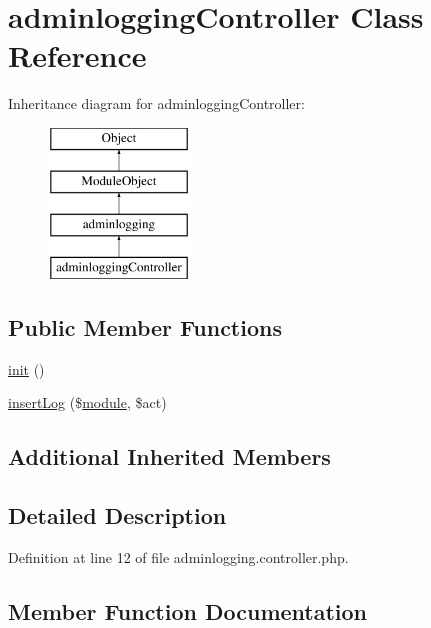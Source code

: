 \hypertarget{classadminloggingController}{}\section{adminlogging\+Controller Class Reference}
\label{classadminloggingController}
Inheritance diagram for adminlogging\+Controller\+:\begin{figure}[H]
\begin{center}
\leavevmode
\includegraphics[height=4.000000cm]{classadminloggingController}
\end{center}
\end{figure}
\subsection*{Public Member Functions}
\begin{DoxyCompactItemize}
\item 
\hyperlink{classadminloggingController_a2b276c4c5c3514a7020a5ae427c62430}{init} ()
\item 
\hyperlink{classadminloggingController_aaf6283ad1e303a0b8f475013f442c20a}{insert\+Log} (\$\hyperlink{classmodule}{module}, \$act)
\end{DoxyCompactItemize}
\subsection*{Additional Inherited Members}


\subsection{Detailed Description}


Definition at line 12 of file adminlogging.\+controller.\+php.



\subsection{Member Function Documentation}
\mbox{\label{classadminloggingController_a2b276c4c5c3514a7020a5ae427c62430}} 
